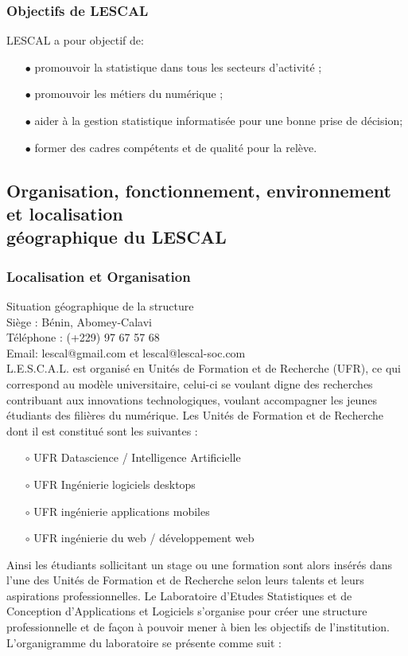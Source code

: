 \subsubsection{Objectifs de LESCAL}
LESCAL a pour objectif de:
\begin{itemize}
    \item[$\bullet$] promouvoir la statistique dans tous les secteurs d'activité ; \\	
    \item[$\bullet$] promouvoir les métiers du numérique ;\\
    \item[$\bullet$] aider à la gestion statistique informatisée pour une bonne prise de décision;\\
    \item[$\bullet$] former des cadres compétents et de qualité pour la relève.
\end{itemize} 



\subsection{Organisation, fonctionnement, environnement et localisation \\ géographique du LESCAL}

\subsubsection{Localisation et Organisation}
Situation géographique de la structure\\
Siège : Bénin, Abomey-Calavi\\
Téléphone : (+229) 97 67 57 68\\	
Email: lescal@gmail.com et lescal@lescal-soc.com
\\
 L.E.S.C.A.L. est organisé en Unités de Formation et de Recherche (UFR), ce qui correspond au modèle universitaire, celui-ci se voulant digne des recherches contribuant aux innovations technologiques, voulant accompagner les jeunes étudiants des filières du numérique. Les Unités de Formation et de Recherche dont il est constitué sont les suivantes :
\begin{itemize}
 \item[$\circ$]	UFR Datascience / Intelligence Artificielle
 \item[$\circ$]	UFR Ingénierie logiciels desktops
 \item[$\circ$]	UFR ingénierie applications mobiles
 \item[$\circ$]	UFR ingénierie du web / développement web
\end{itemize}
 Ainsi les étudiants sollicitant un stage ou une formation sont alors insérés dans l'une des Unités de Formation et de Recherche selon leurs talents et leurs aspirations professionnelles.
 Le Laboratoire d'Etudes Statistiques et de Conception d'Applications et Logiciels s'organise pour créer une structure professionnelle et de façon à pouvoir mener à bien les objectifs de l'institution. L'organigramme du laboratoire se présente comme suit :

